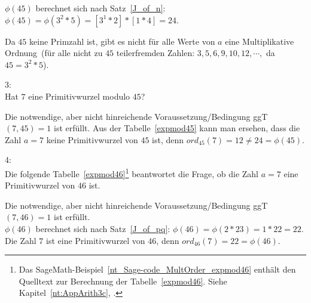 \begin{refsegment}
$\phi(45)$ berechnet sich nach Satz~\ref{J_of_n}: $\phi(45) = \phi(3^2*5) = [3^1*2] * [1*4] = 24$.

Da $45$ keine Primzahl ist, gibt es nicht für alle Werte von $a$
eine \glqq Multiplikative Ordnung\grqq~(für alle nicht zu $45$
teilerfremden Zahlen:
$3, 5, 6, 9, 10, 12, \cdots,$ da $45 = 3^2*5$).



\begin{example}{ 3:}\\
Hat $7$ eine Primitivwurzel modulo $45$?

Die notwendige, aber nicht hinreichende Voraussetzung/Bedingung
ggT$(7,45)=1$ ist erfüllt.
Aus der Tabelle~\ref{expmod45} kann man ersehen, dass die
Zahl $a=7$ keine Primitivwurzel von $45$ ist,
denn $ord_{45}(7) = 12 \not= 24 = \phi(45)$.
\end{example}



\begin{example}{ 4:}\\
Die folgende Tabelle~\ref{expmod46}\footnote{%
  Das SageMath-Beispiel~\ref{nt_Sage-code_MultOrder_expmod46} enthält den
  Quelltext zur Berechnung der Tabelle~\ref{expmod46}.
  Siehe Kapitel~\ref{nt:AppArith3c}, \glqq {}\grqq.}
beantwortet die Frage, ob die Zahl $a=7$ eine Primitivwurzel von $46$ ist.

Die notwendige, aber nicht hinreichende Voraussetzung/Bedingung
ggT$(7,46)=1$ ist erfüllt.\\
$\phi(46)$ berechnet sich nach Satz~\ref{J_of_pq}: $\phi(46) = \phi(2*23) = 1*22 = 22$.
Die Zahl $7$ ist eine Primitivwurzel von $46$,
denn $ord_{46}(7) = 22 = \phi(46)$.
\end{example}


\end{refsegment}
